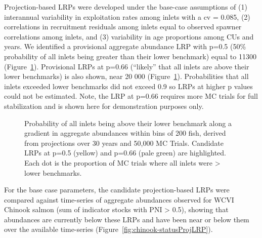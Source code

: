\documentclass[11pt]{book}
\begin{document}
Projection-based LRPs were developed under the base-case assumptions of (1) interannual variability in exploitation rates among inlets with a cv = 0.085, (2) correlations in recruitment residuals among inlets equal to observed spawner correlations among inlets, and (3) variability in age proportions among CUs and years. We identified a provisional aggregate abundance LRP with p=0.5 (50\% probability of all inlets being greater than their lower benchmark) equal to 11300 (Figure~\ref{fig:chinook-baseCaseProjLRP}). Provisional LRPs at p=0.66 (``likely'' that all inlets are above their lower benchmarks) is also shown, near 20 000 (Figure~\ref{fig:chinook-baseCaseProjLRP}). Probabilities that all inlets exceeded lower benchmarks did not exceed 0.9 so LRPs at higher p values could not be estimated. Note, the LRP at p=0.66 requires more MC trials for full stabilization and is shown here for demonstration purposes only.
\begin{figure}[!h]

{\centering {} 

}

\caption{Probability of all inlets being above their lower benchmark along a gradient in aggregate abundances within bins of 200 fish, derived from projections over 30 years and 50,000 MC Trials.  Candidate LRPs at p=0.5 (yellow) and p=0.66 (pale green) are highlighted. Each dot is the proportion of MC trials where all inlets were > lower benchmarks.}\label{fig:chinook-baseCaseProjLRP}
\end{figure}
For the base case parameters, the candidate projection-based LRPs were compared against time-series of aggregate abundances observed for WCVI Chinook salmon (sum of indicator stocks with PNI \textgreater{} 0.5), showing that abundances are currently below these LRPs and have been near or below them over the available time-series (Figure~\ref{fig:chinook-statusProjLRP}).
\end{document}

